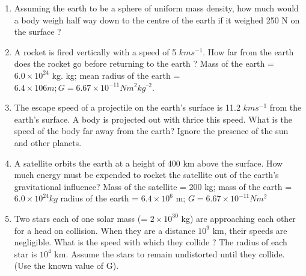 \begin{enumerate}[label=\arabic*.,ref=\thesection.\theenumi]
\item Assuming the earth to be a sphere of uniform mass density, how much would a body weigh half way down to the centre of the earth if it weighed 250 N on the surface ?
\item A rocket is fired vertically with a speed of 5 $km s^{-1}$. How far
from the earth does the rocket go before returning to the earth ?  Mass of the earth = $6.0 \times 10^{24}$ kg.
kg; mean radius of the earth = $6.4 \times 106 m; G = 6.67 \times 10^{-11} N m^2 kg^{–2}$. 
\item  The escape speed of a projectile on the earth’s surface is 11.2 $km s^{-1}$ from the earth's surface. A body is
projected out with thrice this speed. What is the speed of the body far away from the earth? Ignore the presence of the sun and other planets.
\item  A satellite orbits the earth at a height of 400 km above the surface. How much energy must be expended to rocket the satellite out of the earth's gravitational influence? Mass of the satellite = 200 kg; mass of the earth = $6.0\times 10^{24} kg$ radius of 
the earth = $6.4 \times 10^6$ m; $G = 6.67 \times 10^{-11} N m^2$
\item Two stars each of one solar mass (= $2\times10^{30}$ kg) are approaching each other for a head on collision. When they are a distance $10^9$ km, their speeds are negligible. What is
the speed with which they collide ? The radius of each star is $10^4$ km. Assume the stars to remain undistorted until they collide. (Use the known value of G).


\end{enumerate}
